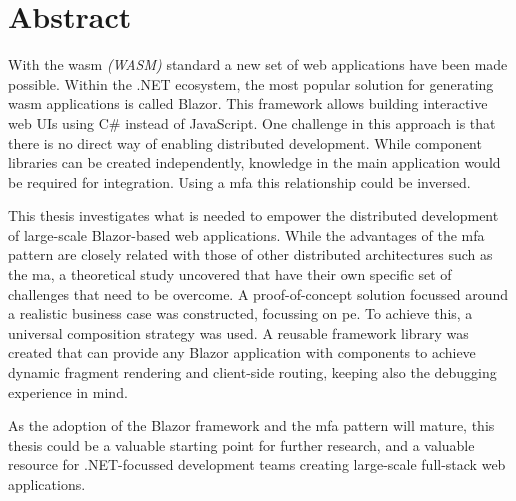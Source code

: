 
\chapter*{Abstract}
\label{ch:abstract}


With the \gls{wasm} \textit{(WASM)} standard a new set of web applications have
been made possible. Within the .NET ecosystem, the most popular solution for
generating \gls{wasm} applications is called Blazor. This framework allows
building interactive web UIs using C\# instead of JavaScript. One challenge in
this approach is that there is no direct way of enabling distributed
development. While component libraries can be created independently, knowledge
in the main application would be required for integration. Using a \gls{mfa}
this relationship could be inversed. 

This thesis investigates what is needed to empower the distributed development
of large-scale Blazor-based web applications. While the advantages of the
\gls{mfa} pattern are closely related with those of other distributed
architectures such as the \gls{ma}, a theoretical study uncovered that
 have their own specific set of challenges that need to
be overcome. A proof-of-concept solution focussed around a realistic business
case was constructed, focussing on \gls{pe}. To achieve this, a universal
composition strategy was used. A reusable framework library was created that can
provide any Blazor application with components to achieve dynamic fragment
rendering and client-side routing, keeping also the debugging experience in
mind.

As the adoption of the Blazor framework and the \gls{mfa} pattern will mature,
this thesis could be a valuable starting point for further research, and a
valuable resource for .NET-focussed development teams
creating large-scale full-stack web applications. 